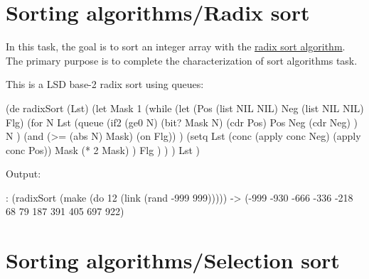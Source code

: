 




\pagebreak{}
\section*{Sorting algorithms/Radix sort}

In this task, the goal is to sort an integer array with the
\href{http://en.wikipedia.org/wiki/Radix\_sort}{radix sort algorithm}.
The primary purpose is to complete the characterization of sort
algorithms task.

\begin{wideverbatim}

This is a LSD base-2 radix sort using queues:

(de radixSort (Lst)
   (let Mask 1
      (while
         (let (Pos (list NIL NIL)  Neg (list NIL NIL)  Flg)
            (for N Lst
               (queue
                  (if2 (ge0 N) (bit? Mask N)
                     (cdr Pos) Pos Neg (cdr Neg) )
                  N )
               (and (>= (abs N) Mask) (on Flg)) )
            (setq
               Lst (conc (apply conc Neg) (apply conc Pos))
               Mask (* 2 Mask) )
            Flg ) ) )
   Lst )

Output:

: (radixSort (make (do 12 (link (rand -999 999)))))
-> (-999 -930 -666 -336 -218 68 79 187 391 405 697 922)

\end{wideverbatim}

\pagebreak{}
\section*{Sorting algorithms/Selection sort}

